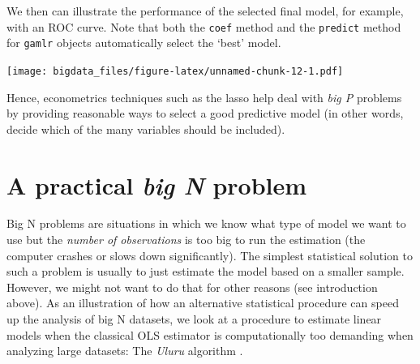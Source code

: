\documentclass[
  12pt,
]{style/krantz}
\newenvironment{Shaded}{\begin{snugshade}}{\end{snugshade}}
\newcommand{\AttributeTok}[1]{\textcolor[rgb]{0.77,0.63,0.00}{#1}}
\newcommand{\CommentTok}[1]{\textcolor[rgb]{0.56,0.35,0.01}{\textit{#1}}}
\newcommand{\ConstantTok}[1]{\textcolor[rgb]{0.00,0.00,0.00}{#1}}
\newcommand{\FunctionTok}[1]{\textcolor[rgb]{0.00,0.00,0.00}{#1}}
\newcommand{\NormalTok}[1]{#1}
\newcommand{\OtherTok}[1]{\textcolor[rgb]{0.56,0.35,0.01}{#1}}
\newcommand{\SpecialCharTok}[1]{\textcolor[rgb]{0.00,0.00,0.00}{#1}}
\newcommand{\StringTok}[1]{\textcolor[rgb]{0.31,0.60,0.02}{#1}}
\begin{document}
We then can illustrate the performance of the selected final model, for example, with an ROC curve. Note that both the \texttt{coef} method and the \texttt{predict} method for \texttt{gamlr} objects automatically select the `best' model.

\begin{Shaded}
\end{Shaded}

\texttt{[image: bigdata\_files/figure-latex/unnamed-chunk-12-1.pdf]}

Hence, econometrics techniques such as the lasso help deal with \emph{big P} problems by providing reasonable ways to select a good predictive model (in other words, decide which of the many variables should be included).

\hypertarget{a-practical-big-n-problem}{%
\section{\texorpdfstring{A practical \emph{big N} problem}{A practical big N problem}}\label{a-practical-big-n-problem}}

Big N problems are situations in which we know what type of model we want to use but the \emph{number of observations} is too big to run the estimation (the computer crashes or slows down significantly). The simplest statistical solution to such a problem is usually to just estimate the model based on a smaller sample. However, we might not want to do that for other reasons (see introduction above). As an illustration of how an alternative statistical procedure can speed up the analysis of big N datasets, we look at a procedure to estimate linear models when the classical OLS estimator is computationally too demanding when analyzing large datasets: The \emph{Uluru} algorithm \citep{dhillon_2013}.
\end{document}
